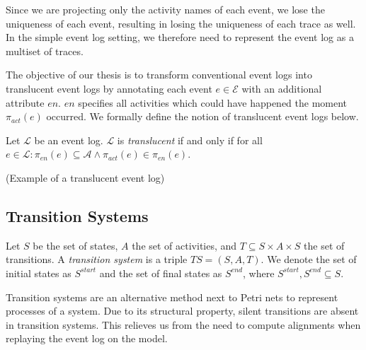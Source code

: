Since we are projecting only the activity names of each event, we lose the uniqueness of each event, resulting in losing the uniqueness of each trace as well. In the simple event log setting, we therefore need to represent the event log as a multiset of traces.

The objective of our thesis is to transform conventional event logs into translucent event logs by annotating each event $e \in \mathcal{E}$ with an additional attribute $en$. $en$ specifies all activities which could have happened the moment $\pi_{act}(e)$ occurred. We formally define the notion of translucent event logs below.

\begin{definition}
    Let $\mathcal{L}$ be an event log. $\mathcal{L}$ is \emph{translucent} if and only if for all $e \in \mathcal{L}: \pi_{en}(e) \subseteq \mathcal{A} \land \pi_{act}(e) \in \pi_{en}(e)$.
\end{definition}

(Example of a translucent event log)

\subsection{Transition Systems}

\begin{definition}
    Let $S$ be the set of states, $A$ the set of activities, and $T \subseteq S \times A \times S$ the set of transitions. A \emph{transition system} is a triple $TS = (S, A, T)$. We denote the set of initial states as $S^{start}$ and the set of final states as $S^{end}$, where $S^{start}, S^{end} \subseteq S$.
\end{definition}

Transition systems are an alternative method next to Petri nets to represent processes of a system. Due to its structural property, silent transitions are absent in transition systems. This relieves us from the need to compute alignments when replaying the event log on the model.

